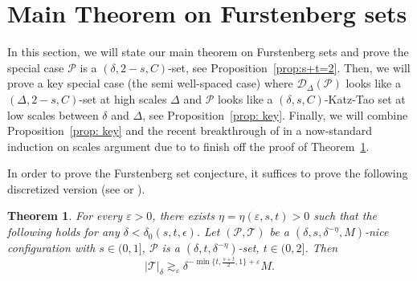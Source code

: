 \documentclass{amsart}
\newtheorem{theorem}[prop]{Theorem}
\newtheorem{conj}[prop]{Conjecture}
\newtheorem{definition}[prop]{Definition}
\newcommand{\eps}{\varepsilon}
\newcommand{\cD}{\mathcal{D}}
\newcommand{\cT}{\mathcal{T}}
\newcommand{\cP}{\mathcal{P}}
\begin{document}





\section{Main Theorem on Furstenberg sets}

In this section, we will state our main theorem on Furstenberg sets and prove the special case $\cP$ is a $(\delta, 2-s, C)$-set, see Proposition~\ref{prop:s+t=2}. Then, we will prove a key special case (the semi well-spaced case) where $\cD_\Delta (\cP)$ looks like a $(\Delta, 2-s, C)$-set at high scales $\Delta$ and $\cP$ looks like a $(\delta, s, C)$-Katz-Tao set at low scales between $\delta$ and $\Delta$, see Proposition~\ref{prop: key}. Finally, we will combine Proposition~\ref{prop: key} and the recent breakthrough of \cite{orponen2023projections} in a now-standard induction on scales argument due to \cite{orponen2021hausdorff} to finish off the proof of Theorem~\ref{Thm: main}.

In order to prove the Furstenberg set conjecture, it suffices to prove the following discretized version (see \cite[Section 3.1]{orponen2021hausdorff} or \cite[Lemma 3.3]{hera2021improved}).
\begin{theorem}\label{Thm: main}
   For every $\eps > 0$, there exists $\eta = \eta(\eps,s,t) > 0$ such that the following holds for any $ \delta < \delta_0(s, t, \epsilon)$. Let $(\cP, \cT)$ be a $(\delta, s, \delta^{-\eta}, M)$-nice configuration with $s\in (0, 1]$, $\cP$ is a $(\delta, t, \delta^{-\eta})$-set, $t\in (0, 2]$. Then
    \[
    |\cT|_{\delta} \gtrsim_\eps \delta^{-\min\{t, \frac{s+t}{2},1\}+\eps} M.
    \]
\end{theorem}
\end{document}
